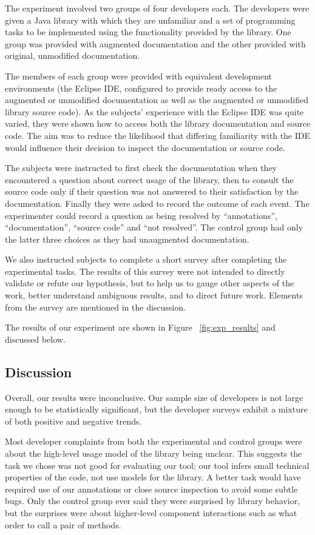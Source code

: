 The experiment involved two groups of four developers each. The developers were
given a Java library with which they are unfamiliar and a set of programming
tasks to be implemented using the functionality provided by the library. One
group was provided with augmented documentation and the other provided with
original, unmodified documentation.

The members of each group were provided with equivalent development
environments (the Eclipse IDE, configured to provide ready access to the
augmented or unmodified documentation as well as the augmented or unmodified
library source code). As the subjects' experience with the Eclipse IDE was
quite varied, they were shown how to access both the library documentation and
source code. The aim was to reduce the likelihood that differing familiarity
with the IDE would influence their decision to inspect the documentation or
source code.

The subjects were instructed to first check the documentation when they
encountered a question about correct usage of the library, then to consult the
source code only if their question was not answered to their satisfaction by
the documentation. Finally they were asked to record the outcome of each event.
The experimenter could record a question as being resolved by ``annotations'',
``documentation'', ``source code'' and ``not resolved''. The control group had
only the latter three choices as they had unaugmented documentation.

We also instructed subjects to complete a short survey after completing the
experimental tasks. The results of this survey were not intended to directly
validate or refute our hypothesis, but to help us to gauge other aspects of the
work, better understand ambiguous results, and to direct future work. Elements
from the survey are mentioned in the discussion.

The results of our experiment are shown in Figure ~\ref{fig:exp_results} and
discussed below.

\subsection{Discussion}
Overall, our results were inconclusive.  Our sample size of developers is not
large enough to be statistically significant, but the developer surveys exhibit
a mixture of both positive and negative trends.

Most developer complaints from both the experimental and control groups were
about the high-level usage model of the library being unclear.  This suggests the task we chose was
not good for evaluating our tool; our tool infers small technical
properties of the code, not use models for the library.  A better task would
have required use of our annotations or close source inspection to avoid some
subtle bugs.  Only the control group ever said they were surprised by library
behavior, but the surprises were about higher-level component interactions such
as what order to call a pair of methods.


